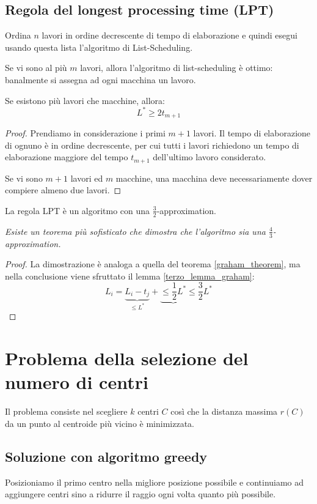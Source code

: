 \documentclass[\main/main.tex]{subfiles}
\begin{document}
\subsection{Regola del longest processing time (LPT)}
Ordina \(n\) lavori in ordine decrescente di tempo di elaborazione e quindi esegui usando questa lista l'algoritmo di List-Scheduling.

\begin{observation}
	Se vi sono al più \(m\) lavori, allora l'algoritmo di list-scheduling è ottimo: banalmente si assegna ad ogni macchina un lavoro.
\end{observation}

\begin{lemma}
	Se esistono più lavori che macchine, allora:
	\[
		L^* \geq 2t_{m+1}
	\]
	\label{terzo_lemma_graham}
\end{lemma}
\begin{proof}
	Prendiamo in considerazione i primi \(m+1\) lavori. Il tempo di elaborazione di ognuno è in ordine decrescente, per cui tutti i lavori richiedono un tempo di elaborazione maggiore del tempo \(t_{m+1}\) dell'ultimo lavoro considerato.

	Se vi sono \(m+1\) lavori ed \(m\) macchine, una macchina deve necessariamente dover compiere almeno due lavori.
\end{proof}

\begin{theorem}
	La regola LPT è un algoritmo con una \(\frac{3}{2}\)-approximation.

	\textit{Esiste un teorema più sofisticato che dimostra che l'algoritmo sia una \(\frac{4}{3}\)-approximation.}
\end{theorem}
\begin{proof}
	La dimostrazione è analoga a quella del teorema \ref{graham_theorem}, ma nella conclusione viene sfruttato il lemma \ref{terzo_lemma_graham}:
	\[
		L_i = \underbrace{L_i - t_j}_{\leq L^*} + \underbrace{\leq \frac{1}{2}L^*} \leq \frac{3}{2} L^*
	\]
\end{proof}
\clearpage
\section{Problema della selezione del numero di centri}
Il problema consiste nel scegliere \(k\) centri \(C\) così che la distanza massima \(r(C)\) da un punto al centroide più vicino è minimizzata.

\subsection{Soluzione con algoritmo greedy}
Posizioniamo il primo centro nella migliore posizione possibile e continuiamo ad aggiungere centri sino a ridurre il raggio ogni volta quanto più possibile.
\end{document}
